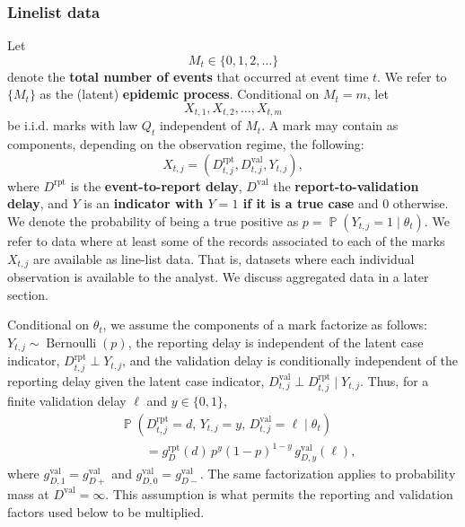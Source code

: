 \documentclass{article}
\theoremstyle{definition}
\theoremstyle{remark}
\newcommand{\Prb}{\operatorname{\mathbb{P}}}
\begin{document}
\subsubsection{Linelist data}
Let
\begin{equation}
    M_t \in \{0,1,2,\dots\}
\end{equation}
denote the \textbf{total number of events} that occurred at event time $t$. We refer to $\{M_t\}$ as the (latent) \textbf{epidemic process}. Conditional on $M_t = m$, let 
\begin{equation}
    X_{t,1}, X_{t,2}, \dots, X_{t,m}
\end{equation}
be i.i.d. marks with law $Q_t$ independent of $M_t$. A mark may contain as components, depending on the observation regime, the following:
\begin{equation}
X_{t,j} = (D^{\text{rpt}}_{t,j}, D^{\text{val}}_{t,j}, Y_{t,j}), 
\end{equation}
where $D^{\text{rpt}}$ is the \textbf{event-to-report delay}, $D^{\text{val}}$ the \textbf{report-to-validation delay}, and $Y$ is an \textbf{indicator with $Y = 1$ if it is a true case} and $0$ otherwise. We denote the probability of being a true positive as $p = \Prb(Y_{t,j} = 1\mid\theta_t)$. We refer to data where at least some of the records associated to each of the marks $X_{t,j}$ are available as line-list data. That is, datasets where each individual observation is available to the analyst. We discuss aggregated data in a later section.

Conditional on $\theta_t$, we assume the components of a mark factorize as follows: $Y_{t,j}\sim\operatorname{Bernoulli}(p)$, the reporting delay is independent of the latent case indicator, $D_{t,j}^{\mathrm{rpt}}\perp Y_{t,j}$, and the validation delay is conditionally independent of the reporting delay given the latent case indicator, $D_{t,j}^{\mathrm{val}}\perp D_{t,j}^{\mathrm{rpt}}\mid Y_{t,j}$. Thus, for a finite validation delay $\ell$ and $y\in\{0,1\}$,
\begin{equation}\label{markfactorization}
\begin{split}
&\Prb\left(D_{t,j}^{\mathrm{rpt}}=d,\,Y_{t,j}=y,\,D_{t,j}^{\mathrm{val}}=\ell\mid\theta_t\right)\\
&\qquad= g_D^{\mathrm{rpt}}(d)\,p^y(1-p)^{1-y}\,g_{D,y}^{\mathrm{val}}(\ell),
\end{split}
\end{equation}
where $g_{D,1}^{\mathrm{val}}=g_{D+}^{\mathrm{val}}$ and $g_{D,0}^{\mathrm{val}}=g_{D-}^{\mathrm{val}}$. The same factorization applies to probability mass at $D^{\mathrm{val}}=\infty$. This assumption is what permits the reporting and validation factors used below to be multiplied.
\end{document}
